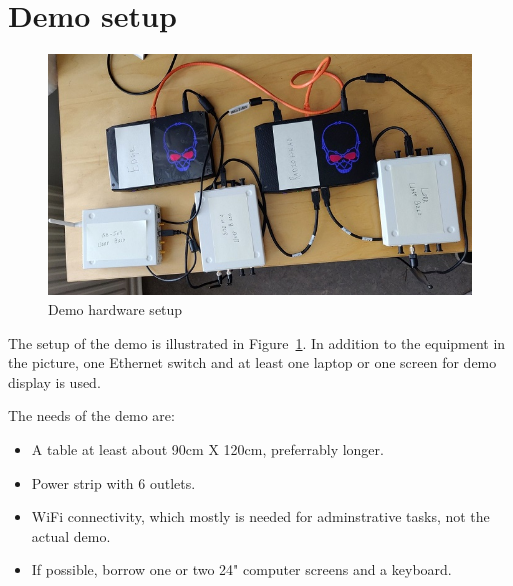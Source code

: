 \documentclass[10pt,emptycopyrightspace]{ewsn-proc}
\begin{document}



%
%


\clearpage
\section{Demo setup}

\begin{figure}[h]
  \centering
	\includegraphics[width= 0.42 \textwidth]{hardware.jpg}
	\caption{Demo hardware setup}
	\label{fig:hardware}
\end{figure}

The setup of the demo is illustrated in Figure~\ref{fig:hardware}.  In
addition to the equipment in the picture, one Ethernet switch and at
least one laptop or one screen for demo display is used.

The needs of the demo are:
\begin{itemize}
  \item A table at least about 90cm X 120cm, preferrably longer.
  \item Power strip with 6 outlets.
  \item WiFi connectivity, which mostly is needed for adminstrative
    tasks, not the actual demo.
  \item If possible, borrow one or two 24" computer screens and a keyboard.
\end{itemize}
\end{document}
